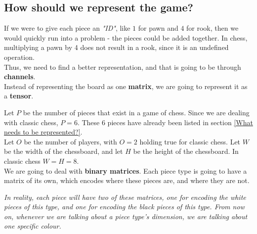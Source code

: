 \documentclass[12pt]{article}
\begin{document}
\subsection{How should we represent the game?}
If we were to give each piece an \textit{"ID"}, like \(1\) for pawn and \(4\) for rook, then we would quickly run into a problem - the pieces could be added together. In chess, multiplying a pawn by 4 does not result in a rook, since it is an undefined operation. \\
Thus, we need to find a better representation, and that is going to be through \textbf{channels}. \\ Instead of representing the board as one \textbf{matrix}, we are going to represent it as a \textbf{tensor}. \\

\newpage

\noindent
Let \(P\) be the number of pieces that exist in a game of chess. Since we are dealing with classic chess, \(P = 6\). These 6 pieces have already been listed in section \ref{What needs to be represented?}. \\
Let \(O\) be the number of players, with \(O = 2\) holding true for classic chess. Let \(W\) be the width of the chessboard, and let \(H\) be the height of the chessboard. In classic chess \(W = H = 8\). \\
We are going to deal with \textbf{binary matrices}. Each piece type is going to have a matrix of its own, which encodes where these pieces are, and where they are not.

\begin{displayquote}
	\textit{In reality, each piece will have two of these matrices, one for encoding the white pieces of this type, and one for encoding the black pieces of this type. From now on, whenever we are talking about a piece type's dimension, we are talking about one specific colour.}
\end{displayquote}
\end{document}
